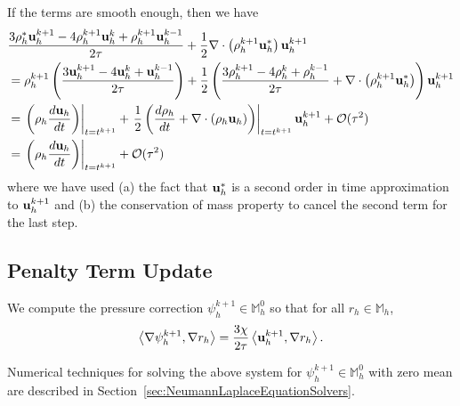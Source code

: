 \documentclass[letterpaper]{erdc}
\begin{document}
\begin{remark}
If the terms are smooth enough, then we have
\begin{align}
  &\frac{3\rho_h^{*}\textbf{u}_h^{k+1}-4\rho_h^{k+1}\textbf{u}_h^{k} +\rho_h^{k+1}\textbf{u}_h^{k-1}}{2\tau} +\frac{1}{2}\nabla\cdot\left(\rho_h^{k+1}\textbf{u}_h^{*}\right)\textbf{u}_h^{k+1}\\
   &= \rho_h^{k+1}\left(\frac{3\textbf{u}_h^{k+1} - 4\textbf{u}_h^{k} + \textbf{u}_h^{k-1}}{2\tau}\right) + \frac{1}{2} \left( \frac{3\rho_h^{k+1} -4\rho_h^{k} + \rho_h^{k-1}}{2\tau} + \nabla\cdot\left(\rho_h^{k+1}\textbf{u}_h^{*}\right)\right)\textbf{u}_h^{k+1}\\
  &= \left.\left(\rho_h\frac{d\textbf{u}_h}{dt} \right)\right|_{t=t^{k+1}} + \left.\frac{1}{2} \left( \frac{d\rho_h}{dt} +\nabla\cdot\left(\rho_h\textbf{u}_h\right)\right)\right|_{t=t^{k+1}}\textbf{u}_h^{k+1} + \mathcal{O}(\tau^2)\\
  &=\left.\left(\rho_h\frac{d\textbf{u}_h}{dt} \right)\right|_{t=t^{k+1}} + \mathcal{O}(\tau^{2})
\end{align}
where we have used (a) the fact that $\textbf{u}_h^{*}$ is a second order in time approximation to $\textbf{u}_h^{k+1}$ and (b) the conservation of mass property to cancel the second term for the last step.
\end{remark}




%
%
\subsection{Penalty Term Update}
We compute the pressure correction $\psi_h^{k+1}\in \mathbb{M}_h^0$ so that for all $r_h\in \mathbb{M}_h$,
\begin{equation}
  \left\langle \nabla\psi_h^{k+1}, \nabla r_h \right\rangle = \frac{3\chi}{2\tau}\left\langle \textbf{u}_h^{k+1}, \nabla r_h \right\rangle.
\end{equation}

\begin{remark}
  Numerical techniques for solving the above system for $\psi_h^{k+1}\in \mathbb{M}_h^0$ with zero mean are described in Section~\ref{sec:NeumannLaplaceEquationSolvers}.
\end{remark}

%
%
\end{document}
